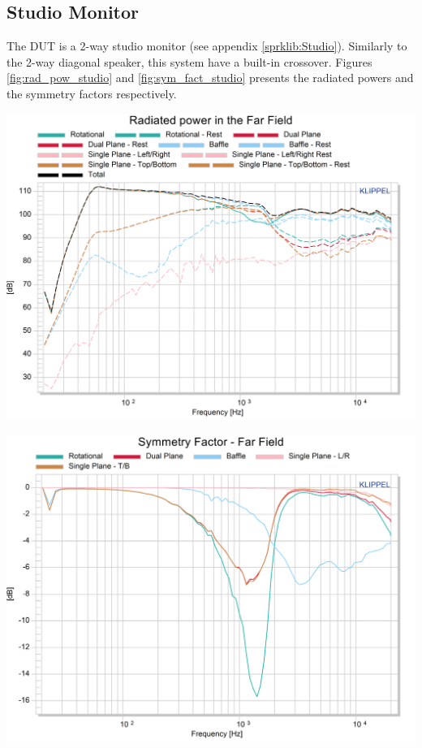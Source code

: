 \documentclass{report}
\begin{document}
\subsection{Studio Monitor}
 The DUT is a 2-way studio monitor (see appendix \ref{sprklib:Studio}). Similarly to the 2-way diagonal speaker, this system have a built-in crossover. Figures \ref{fig:rad_pow_studio} and \ref{fig:sym_fact_studio} presents the radiated powers and the symmetry factors respectively.

\begin{minipage}{0.5\textwidth}
\begin{center}
	\includegraphics[width=.9\textwidth]{Sym/Rad_Pow_studio} 
    \captionsetup{hypcap=false} 
	\label{fig:rad_pow_studio}
\end{center}
\end{minipage}
\begin{minipage}{0.5\textwidth}
\begin{center}
	\includegraphics[width=.9\textwidth]{Sym/Sym_Fact_studio} 
    \captionsetup{hypcap=false} 
	\label{fig:sym_fact_studio}
\end{center}
\end{minipage}
\vspace{0.1cm}
\end{document}
